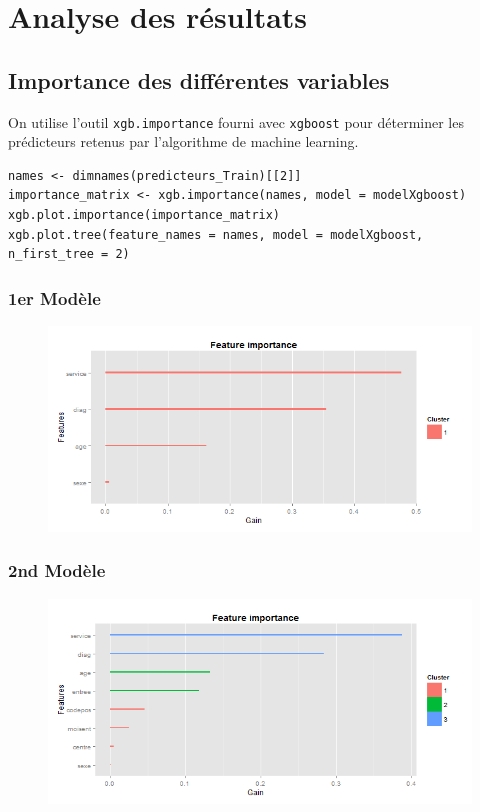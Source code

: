 \documentclass[a4paper,11pt]{article}
\begin{document}
\section{Analyse des résultats}
\subsection{Importance des différentes variables}
On utilise l'outil \texttt{xgb.importance} fourni avec \texttt{xgboost} pour déterminer les prédicteurs retenus par l'algorithme de machine learning.

\begin{lstlisting}
names <- dimnames(predicteurs_Train)[[2]]
importance_matrix <- xgb.importance(names, model = modelXgboost)
xgb.plot.importance(importance_matrix)
xgb.plot.tree(feature_names = names, model = modelXgboost, n_first_tree = 2)
\end{lstlisting}

\subsubsection{1er Modèle}
\begin{figure}[H]
\begin{center}
\includegraphics [width =18cm]{M1.png}
\end{center}
\end{figure}
\subsubsection{2nd Modèle}

\begin{figure}[H]
\begin{center}
\includegraphics [width =18cm]{M2.png}
\end{center}
\end{figure}
\end{document}
